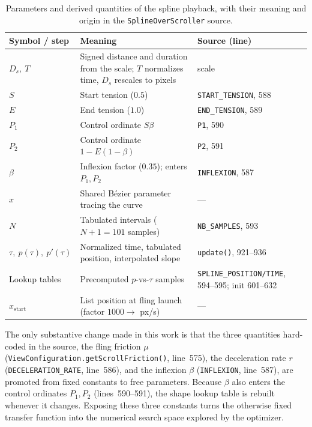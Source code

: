 \documentclass[12pt,a4paper]{report}
\begin{document}
        \begin{table}[htbp]
        \centering
        \begin{tabular}{l p{5.2cm} p{4.3cm}}
        \hline
        Symbol / step & Meaning & Source (line) \\
        \hline
        $D_s,\ T$ & Signed distance and duration from the scale; $T$ normalizes time, $D_s$ rescales to pixels & scale \\
        $S$ & Start tension ($0.5$) & \texttt{START\_TENSION}, 588 \\
        $E$ & End tension ($1.0$) & \texttt{END\_TENSION}, 589 \\
        $P_1$ & Control ordinate $S\beta$ & \texttt{P1}, 590 \\
        $P_2$ & Control ordinate $1-E(1-\beta)$ & \texttt{P2}, 591 \\
        $\beta$ & Inflexion factor ($0.35$); enters $P_1,P_2$ & \texttt{INFLEXION}, 587 \\
        $x$ & Shared B\'ezier parameter tracing the curve & --- \\
        $N$ & Tabulated intervals ($N+1=101$ samples) & \texttt{NB\_SAMPLES}, 593 \\
        $\tau,\ p(\tau),\ p'(\tau)$ & Normalized time, tabulated position, interpolated slope & \texttt{update()}, 921--936 \\
        Lookup tables & Precomputed $p$-vs-$\tau$ samples & \texttt{SPLINE\_POSITION/TIME}, 594--595; init 601--632 \\
        $x_{\text{start}}$ & List position at fling launch (factor $1000\to$ px/s) & --- \\
        \hline
        \end{tabular}
        \caption{Parameters and derived quantities of the spline playback, with their meaning and origin in the \texttt{SplineOverScroller} source.}
        \label{tab:spline-params}
        \end{table}

        The only substantive change made in this work is that the three quantities hard-coded in the source, the fling friction $\mu$ (\texttt{ViewConfiguration.getScrollFriction()}, line~575), the deceleration rate $r$ (\texttt{DECELERATION\_RATE}, line~586), and the inflexion $\beta$ (\texttt{INFLEXION}, line~587), are promoted from fixed constants to free parameters. Because $\beta$ also enters the control ordinates $P_1,P_2$ (lines~590--591), the shape lookup table is rebuilt whenever it changes. Exposing these three constants turns the otherwise fixed transfer function into the numerical search space explored by the optimizer.
\end{document}
